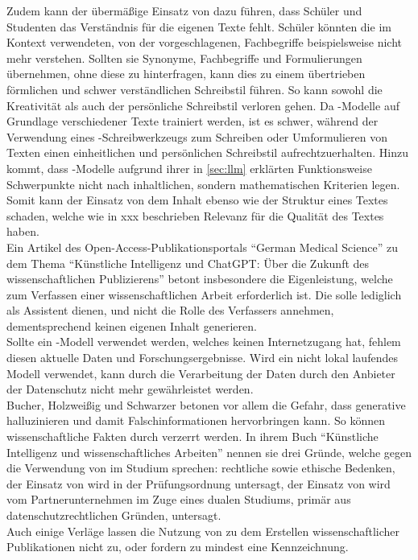 \documentclass[../main.tex]{subfiles}
\begin{document}
Zudem kann der übermäßige Einsatz von  dazu führen, dass Schüler und Studenten das Verständnis für die eigenen Texte fehlt. Schüler könnten die im 
Kontext verwendeten, von der  vorgeschlagenen, Fachbegriffe beispielsweise nicht mehr verstehen. Sollten sie Synonyme, Fachbegriffe und Formulierungen 
übernehmen, ohne diese zu hinterfragen, kann dies zu einem übertrieben förmlichen und schwer verständlichen Schreibstil führen\cite{teachers}. 
So kann sowohl die Kreativität als auch der persönliche Schreibstil verloren gehen. Da -Modelle auf Grundlage verschiedener Texte trainiert werden, ist es
schwer, während der Verwendung eines -Schreibwerkzeugs zum Schreiben oder Umformulieren von Texten einen einheitlichen und persönlichen Schreibstil aufrechtzuerhalten\cite{creativeWriting}. Hinzu kommt,
dass -Modelle aufgrund ihrer in \autoref{sec:llm} erklärten Funktionsweise Schwerpunkte nicht nach inhaltlichen, sondern mathematischen Kriterien legen\cite{berensBolk}. Somit kann der 
Einsatz von  dem Inhalt ebenso wie der Struktur eines Textes schaden, welche wie in xxx beschrieben Relevanz für die Qualität des Textes haben.\\

Ein Artikel des Open-Access-Publikationsportals "`German Medical Science"' zu dem Thema "`Künstliche Intelligenz und ChatGPT: Über die Zukunft des wissenschaftlichen Publizierens"'
betont insbesondere die Eigenleistung, welche zum Verfassen einer wissenschaftlichen Arbeit erforderlich ist. Die  solle lediglich als Assistent dienen, und
nicht die Rolle des Verfassers annehmen, dementsprechend keinen eigenen Inhalt generieren.\cite{ZukunftWissenschaftlichesPublizieren} \\ Sollte ein -Modell verwendet werden, welches keinen Internetzugang hat,
fehlem diesen aktuelle Daten und Forschungsergebnisse. Wird ein nicht lokal laufendes Modell verwendet, kann durch die Verarbeitung der Daten durch den  Anbieter
der Datenschutz nicht mehr gewährleistet werden.\cite{ZukunftWissenschaftlichesPublizieren} \\ Bucher, Holzweißig und Schwarzer betonen vor allem die Gefahr, dass 
generative  halluzinieren und damit Falschinformationen hervorbringen kann. So können wissenschaftliche Fakten durch  verzerrt werden. In ihrem Buch "`Künstliche Intelligenz und wissenschaftliches Arbeiten"' nennen sie drei 
Gründe, welche gegen die Verwendung von  im Studium sprechen: rechtliche sowie ethische Bedenken, der Einsatz von  wird in der Prüfungsordnung untersagt, 
der Einsatz von  wird vom Partnerunternehmen im Zuge eines dualen Studiums, primär aus datenschutzrechtlichen Gründen, untersagt.\cite{BucherSchwarzerHolzwweißig} \\Auch einige Verläge lassen 
die Nutzung von  zu dem Erstellen wissenschaftlicher Publikationen nicht zu, oder fordern zu mindest eine Kennzeichnung\cite{ZukunftWissenschaftlichesPublizieren}. 
\end{document}
